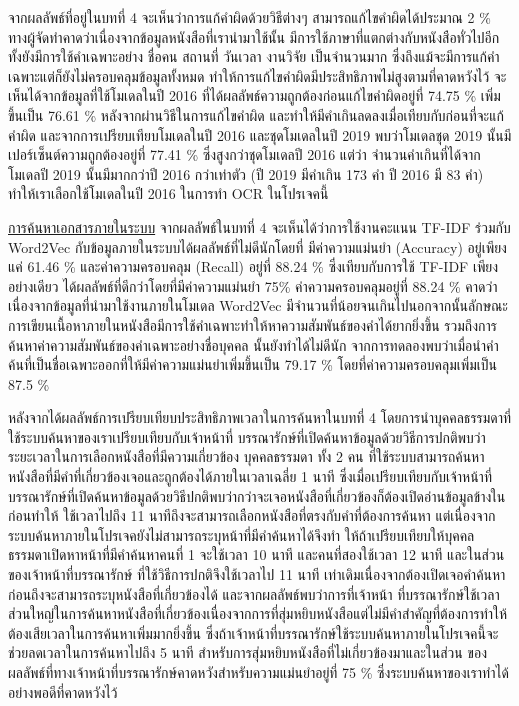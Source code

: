 จากผลลัพธ์ที่อยู่ในบทที่ 4 จะเห็นว่าการแก้คำผิดด้วยวิธีต่างๆ สามารถแก้ไขคำผิดได้ประมาณ 2 \% ทางผู้จัดทำคาดว่าเนื่องจากข้อมูลหนังสือที่เรานำมาใช้นั้น
มีการใช้ภาษาที่แตกต่างกับหนังสือทั่วไปอีกทั้งยังมีการใช้คำเฉพาะอย่าง ชื่อคน สถานที่ วันเวลา งานวิจัย เป็นจำนวนมาก ซึ่งถึงแม้จะมีการแก้คำเฉพาะแต่ก็ยังไม่ครอบคลุมข้อมูลทั้งหมด
ทำให้การแก้ไขคำผิดมีประสิทธิภาพไม่สูงตามที่คาดหวังไว้ จะเห็นได้จากข้อมูลที่ใช้โมเดลในปี 2016 
ที่ได้ผลลัพธ์ความถูกต้องก่อนแก้ไขคำผิดอยู่ที่ 74.75 \% เพิ่มขึ้นเป็น 76.61 \% หลังจากผ่านวิธีในการแก้ไขคำผิด และทำให้มีคำเกินลดลงเมื่อเทียบกับก่อนที่จะแก้คำผิด
และจากการเปรียบเทียบโมเดลในปี 2016 และชุดโมเดลในปี 2019 พบว่าโมเดลชุด 2019 นั้นมีเปอร์เซ็นต์ความถูกต้องอยู่ที่ 77.41 \% ซึ่งสูงกว่าชุดโมเดลปี 2016 แต่ว่า จำนวนคำเกินที่ได้จาก โมเดลปี 2019
นั้นมีมากกว่าปี 2016 กว่าเท่าตัว (ปี 2019 มีคำเกิน 173 คำ ปี 2016 มี 83 คำ) ทำให้เราเลือกใช้โมเดลในปี 2016 ในการทำ OCR ในโปรเจคนี้

\underline{การค้นหาเอกสารภายในระบบ}
จากผลลัพธ์ในบทที่ 4 จะเห็นได้ว่าการใช้งานคะแนน TF-IDF ร่วมกับ Word2Vec กับข้อมูลภายในระบบได้ผลลัพธ์ที่ไม่ดีนักโดยที่
มีค่าความแม่นยำ (Accuracy) อยู่เพียงแค่ 61.46 \% และค่าความครอบคลุม (Recall) อยู่ที่ 88.24 \% ซึ่งเทียบกับการใช้ TF-IDF เพียงอย่างเดียว
ได้ผลลัพธ์ที่ดีกว่าโดยที่มีค่าความแม่นยำ 75\% ค่าความครอบคลุมอยู่ที่ 88.24 \% คาดว่าเนื่องจากข้อมูลที่นำมาใช้งานภายในโมเดล Word2Vec 
มีจำนวนที่น้อยจนเกินไปนอกจากนั้นลักษณะการเขียนเนื้อหาภายในหนังสือมีการใช้คำเฉพาะทำให้หาความสัมพันธ์ของคำได้ยากยิ่งขึ้น
รวมถึงการค้นหาค่าความสัมพันธ์ของคำเฉพาะอย่างชื่อบุคคล นั้นยังทำได้ไม่ดีนัก จากการทดลองพบว่าเมื่อนำคำค้นที่เป็นชื่อเฉพาะออกที่ให้มีค่าความแม่นยำเพิ่มขึ้นเป็น 79.17 \%
โดยที่ค่าความครอบคลุมเพิ่มเป็น 87.5 \%

หลังจากได้ผลลัพธ์การเปรียบเทียบประสิทธิภาพเวลาในการค้นหาในบทที่ 4 โดยการนำบุคคลธรรมดาที่ใช้ระบบค้นหาของเราเปรียบเทียบกับเจ้าหน้าที่
บรรณารักษ์ที่เปิดค้นหาข้อมูลด้วยวิธีการปกติพบว่า
ระยะเวลาในการเลือกหนังสือที่มีความเกี่ยวข้อง บุคคลธรรมดา ทั้ง 2 คน ที่ใช้ระบบสามารถค้นหาหนังสือที่มีคำที่เกี่ยวข้องเจอและถูกต้องได้ภายในเวลาเฉลี่ย 
1 นาที ซึ่งเมื่อเปรียบเทียบกับเจ้าหน้าที่บรรณารักษ์ที่เปิดค้นหาข้อมูลด้วยวิธีปกติพบว่ากว่าจะเจอหนังสือที่เกี่ยวข้องก็ต้องเปิดอ่านข้อมูลข้างในก่อนทำให้
ใช้เวลาไปถึง 11 นาทีถึงจะสามารถเลือกหนังสือที่ตรงกับคำที่ต้องการค้นหา แต่เนื่องจากระบบค้นหาภายในโปรเจคยังไม่สามารถระบุหน้าที่มีคำค้นหาได้จึงทำ
ให้ถ้าเปรียบเทียบให้บุคคลธรรมดาเปิดหาหน้าที่มีคำค้นหาคนที่ 1 จะใช้เวลา 10 นาที และคนที่สองใช้เวลา 12 นาที และในส่วนของเจ้าหน้าที่บรรณารักษ์
ที่ใช้วิธีการปกติจึงใช้เวลาไป 11 นาที เท่าเดิมเนื่องจากต้องเปิดเจอคำค้นหาก่อนถึงจะสามารถระบุหนังสือที่เกี่ยวข้องได้ และจากผลลัพธ์พบว่าการที่เจ้าหน้า
ที่บรรณารักษ์ใช้เวลาส่วนใหญ่ในการค้นหาหนังสือที่เกี่ยวข้องเนื่องจากการที่สุ่มหยิบหนังสือแต่ไม่มีคำสำคัญที่ต้องการทำให้ต้องเสียเวลาในการค้นหาเพิ่มมากยิ่งขึ้น
ซึ่งถ้าเจ้าหน้าที่บรรณารักษ์ใช้ระบบค้นหาภายในโปรเจคนี้จะช่วยลดเวลาในการค้นหาไปถึง 5 นาที สำหรับการสุ่มหยิบหนังสือที่ไม่เกี่ยวข้องมาและในส่วน
ของผลลัพธ์ที่ทางเจ้าหน้าที่บรรณารักษ์คาดหวังสำหรับความแม่นยำอยู่ที่ 75 \% ซึ่งระบบค้นหาของเราทำได้อย่างพอดีที่คาดหวังไว้

